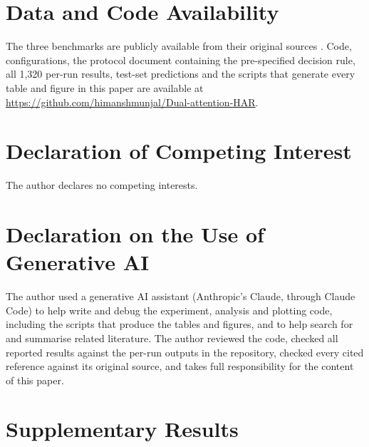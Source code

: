 \documentclass[11pt,a4paper]{article}
\begin{document}
\section*{Data and Code Availability}
The three benchmarks are publicly available from their original sources \cite{anguita2013public,kwapisz2011activity,reiss2012introducing}. Code, configurations, the protocol document containing the pre-specified decision rule, all 1{,}320 per-run results, test-set predictions and the scripts that generate every table and figure in this paper are available at \url{https://github.com/himanshmunjal/Dual-attention-HAR}.

\section*{Declaration of Competing Interest}
The author declares no competing interests.

\section*{Declaration on the Use of Generative AI}
The author used a generative AI assistant (Anthropic's Claude, through Claude Code) to help write and debug the experiment, analysis and plotting code, including the scripts that produce the tables and figures, and to help search for and summarise related literature. The author reviewed the code, checked all reported results against the per-run outputs in the repository, checked every cited reference against its original source, and takes full responsibility for the content of this paper.




\appendix
\section{Supplementary Results}
\end{document}
